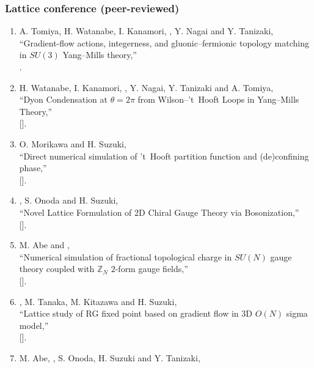 \subsubsection{Lattice conference (peer-reviewed)}
\begin{enumerate}
 \item A. Tomiya, H. Watanabe, I. Kanamori, \OM, Y. Nagai and Y. Tanizaki,\\
       ``Gradient-flow actions, integerness, and gluonic--fermionic topology
matching in $SU(3)$ Yang--Mills theory,''\\
       .
 \item H. Watanabe, I. Kanamori, \OM, Y. Nagai, Y. Tanizaki and A. Tomiya,\\
       ``Dyon Condensation at $\theta=2\pi$ from Wilson--'t~Hooft Loops in Yang--Mills Theory,''\\
       [].
 \item O. Morikawa and H. Suzuki,\\
       ``Direct numerical simulation of 't~Hooft partition function and (de)confining phase,''\\
       [].
 \item \OM, S. Onoda and H. Suzuki,\\
       ``Novel Lattice Formulation of $2$D Chiral Gauge Theory via Bosonization,''\\
       [].
 \item M. Abe and \OM,\\
       ``Numerical simulation of fractional topological charge in $SU(N)$ gauge theory coupled with $\mathbb{Z}_N$ $2$-form gauge fields,''\\
       [].
 \item \OM, M. Tanaka, M. Kitazawa and H. Suzuki,\\
       ``Lattice study of RG fixed point based on gradient flow in $3$D $O(N)$ sigma model,''\\
       [].
 \item M. Abe, \OM, S. Onoda, H. Suzuki and Y. Tanizaki,\\

\end{enumerate}
